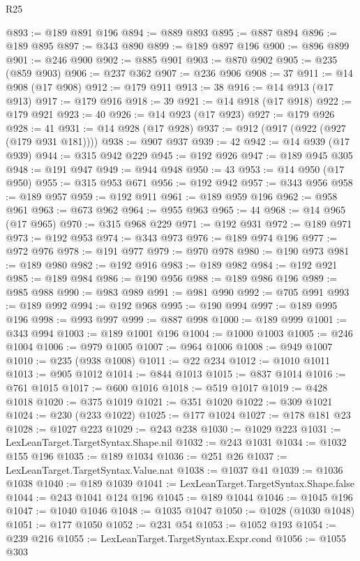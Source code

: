 \begin{lexlean}{R25}
\begin{coremodule}
@893 := @189 @891 @196
@894 := @889 @893
@895 := @887 @894
@896 := @189 @895
@897 := @343 @890
@899 := @189 @897 @196
@900 := @896 @899
@901 := @246 @900
@902 := @885 @901
@903 := @870 @902
@905 := @235 (@859 @903)
@906 := @237 @362
@907 := @236 @906
@908 := 37
@911 := @14 @908 (@17 @908)
@912 := @179 @911
@913 := 38
@916 := @14 @913 (@17 @913)
@917 := @179 @916
@918 := 39
@921 := @14 @918 (@17 @918)
@922 := @179 @921
@923 := 40
@926 := @14 @923 (@17 @923)
@927 := @179 @926
@928 := 41
@931 := @14 @928 (@17 @928)
@937 := @912 (@917 (@922 (@927 (@179 @931 @181))))
@938 := @907 @937
@939 := 42
@942 := @14 @939 (@17 @939)
@944 := @315 @942 @229
@945 := @192 @926
@947 := @189 @945 @305
@948 := @191 @947
@949 := @944 @948
@950 := 43
@953 := @14 @950 (@17 @950)
@955 := @315 @953 @671
@956 := @192 @942
@957 := @343 @956
@958 := @189 @957
@959 := @192 @911
@961 := @189 @959 @196
@962 := @958 @961
@963 := @673 @962
@964 := @955 @963
@965 := 44
@968 := @14 @965 (@17 @965)
@970 := @315 @968 @229
@971 := @192 @931
@972 := @189 @971
@973 := @192 @953
@974 := @343 @973
@976 := @189 @974 @196
@977 := @972 @976
@978 := @191 @977
@979 := @970 @978
@980 := @190 @973
@981 := @189 @980
@982 := @192 @916
@983 := @189 @982
@984 := @192 @921
@985 := @189 @984
@986 := @190 @956
@988 := @189 @986 @196
@989 := @985 @988
@990 := @983 @989
@991 := @981 @990
@992 := @705 @991
@993 := @189 @992
@994 := @192 @968
@995 := @190 @994
@997 := @189 @995 @196
@998 := @993 @997
@999 := @887 @998
@1000 := @189 @999
@1001 := @343 @994
@1003 := @189 @1001 @196
@1004 := @1000 @1003
@1005 := @246 @1004
@1006 := @979 @1005
@1007 := @964 @1006
@1008 := @949 @1007
@1010 := @235 (@938 @1008)
@1011 := @22 @234
@1012 := @1010 @1011
@1013 := @905 @1012
@1014 := @844 @1013
@1015 := @837 @1014
@1016 := @761 @1015
@1017 := @600 @1016
@1018 := @519 @1017
@1019 := @428 @1018
@1020 := @375 @1019
@1021 := @351 @1020
@1022 := @309 @1021
@1024 := @230 (@233 @1022)
@1025 := @177 @1024
@1027 := @178 @181 @23
@1028 := @1027 @223
@1029 := @243 @238
@1030 := @1029 @223
@1031 := LexLeanTarget.TargetSyntax.Shape.nil
@1032 := @243 @1031
@1034 := @1032 @155 @196
@1035 := @189 @1034
@1036 := @251 @26
@1037 := LexLeanTarget.TargetSyntax.Value.nat
@1038 := @1037 @41
@1039 := @1036 @1038
@1040 := @189 @1039
@1041 := LexLeanTarget.TargetSyntax.Shape.false
@1044 := @243 @1041 @124 @196
@1045 := @189 @1044
@1046 := @1045 @196
@1047 := @1040 @1046
@1048 := @1035 @1047
@1050 := @1028 (@1030 @1048)
@1051 := @177 @1050
@1052 := @231 @54
@1053 := @1052 @193
@1054 := @239 @216
@1055 := LexLeanTarget.TargetSyntax.Expr.cond
@1056 := @1055 @303

\end{coremodule}
\end{lexlean}
